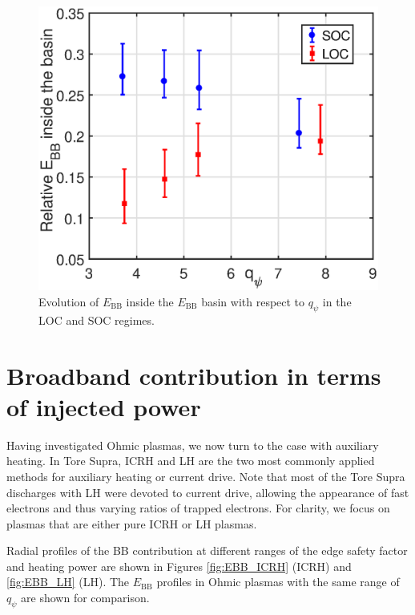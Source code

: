 \begin{figure}[!h]
\begin{centering}
\includegraphics[scale=0.45]{fig_Trend_LOCSOC.eps}
\par\end{centering}
\caption{Evolution of $E_\mathrm{BB}$ inside the $E_\mathrm{BB}$ basin with respect to $q_{\psi}$ in the LOC and SOC regimes.}
\label{fig:EBBtrendLS}
\end{figure}


\section{Broadband contribution in terms of injected power} \label{sec:radial_profile_ICRH_LH}

Having investigated Ohmic plasmas, we now turn to the case with auxiliary heating. In Tore Supra, ICRH and LH are the two most commonly applied methods for auxiliary heating or current drive. Note that most of the Tore Supra discharges with LH were devoted to current drive, allowing the appearance of fast electrons and thus varying ratios of trapped electrons. For clarity, we focus on plasmas that are either pure ICRH or LH plasmas.

Radial profiles of the BB contribution at different ranges of the edge safety factor and heating power are shown in Figures \ref{fig:EBB_ICRH} (ICRH) and \ref{fig:EBB_LH} (LH). The $E_\mathrm{BB}$ profiles in Ohmic plasmas with the same range of $q_{\psi}$ are shown for comparison.


